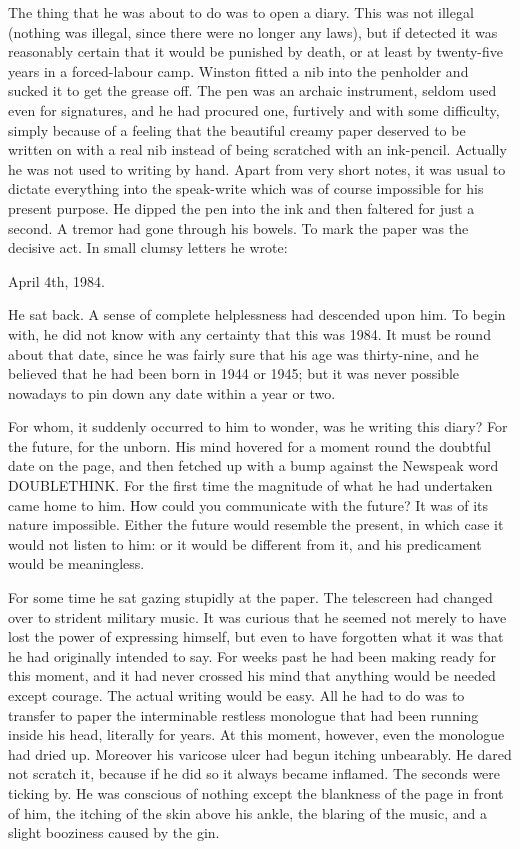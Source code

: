 \documentclass{article}
\begin{document}
The thing that he was about to do was to open a diary. This was not illegal
(nothing was illegal, since there were no longer any laws), but if detected
it was reasonably certain that it would be punished by death, or at least
by twenty-five years in a forced-labour camp. Winston fitted a nib into
the penholder and sucked it to get the grease off. The pen was an archaic
instrument, seldom used even for signatures, and he had procured one,
furtively and with some difficulty, simply because of a feeling that the
beautiful creamy paper deserved to be written on with a real nib instead
of being scratched with an ink-pencil. Actually he was not used to writing
by hand. Apart from very short notes, it was usual to dictate everything
into the speak-write which was of course impossible for his present
purpose. He dipped the pen into the ink and then faltered for just a
second. A tremor had gone through his bowels. To mark the paper was the
decisive act. In small clumsy letters he wrote:


   April 4th, 1984.


He sat back. A sense of complete helplessness had descended upon him. To
begin with, he did not know with any certainty that this was 1984. It
must be round about that date, since he was fairly sure that his age was
thirty-nine, and he believed that he had been born in 1944 or 1945; but
it was never possible nowadays to pin down any date within a year or two.

For whom, it suddenly occurred to him to wonder, was he writing this diary?
For the future, for the unborn. His mind hovered for a moment round the
doubtful date on the page, and then fetched up with a bump against the
Newspeak word DOUBLETHINK. For the first time the magnitude of what he had
undertaken came home to him. How could you communicate with the future? It
was of its nature impossible. Either the future would resemble the present,
in which case it would not listen to him: or it would be different from it,
and his predicament would be meaningless.

For some time he sat gazing stupidly at the paper. The telescreen had
changed over to strident military music. It was curious that he seemed
not merely to have lost the power of expressing himself, but even to have
forgotten what it was that he had originally intended to say. For weeks
past he had been making ready for this moment, and it had never crossed
his mind that anything would be needed except courage. The actual writing
would be easy. All he had to do was to transfer to paper the interminable
restless monologue that had been running inside his head, literally for
years. At this moment, however, even the monologue had dried up. Moreover
his varicose ulcer had begun itching unbearably. He dared not scratch it,
because if he did so it always became inflamed. The seconds were ticking
by. He was conscious of nothing except the blankness of the page in front
of him, the itching of the skin above his ankle, the blaring of the music,
and a slight booziness caused by the gin.
\end{document}

